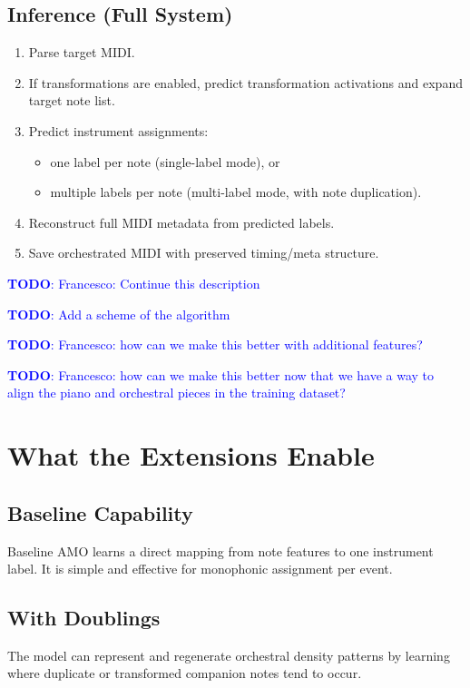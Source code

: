 \documentclass{aimc2026}
\newcommand{\todo}[1]{\textcolor{blue}{\textbf{TODO}: #1}}
\begin{document}
\subsection{Inference (Full System)}
\begin{enumerate}
	\item Parse target MIDI.
	\item If transformations are enabled, predict transformation activations and expand target note list.
	\item Predict instrument assignments:
	\begin{itemize}
		\item one label per note (single-label mode), or
		\item multiple labels per note (multi-label mode, with note duplication).
	\end{itemize}
	\item Reconstruct full MIDI metadata from predicted labels.
	\item Save orchestrated MIDI with preserved timing/meta structure.
\end{enumerate}

\todo{Francesco: Continue this description}

\todo{Add a scheme of the algorithm}

\todo{Francesco: how can we make this better with additional features?}

\todo{Francesco: how can we make this better now that we have a way to align the piano and orchestral pieces in the training dataset?}

\section{What the Extensions Enable}

\subsection{Baseline Capability}
Baseline AMO learns a direct mapping from note features to one instrument label. It is simple and effective for monophonic assignment per event.

\subsection{With Doublings}
The model can represent and regenerate orchestral density patterns by learning where duplicate or transformed companion notes tend to occur.
\end{document}
